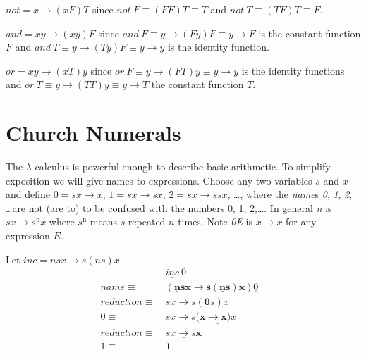 \documentclass[11pt,letterpaper,fleqn]{report}
\newcommand{\reason}[1]{{#1}\equiv\ }
\begin{document}
\(not = x\to (xF)T\) since \(not\ F\equiv (FF)T\equiv T\)
and \(not\ T\equiv (TF)T\equiv F\).

\(and = xy\to (xy)F\) since \(and\ F\equiv y\to (Fy)F\equiv y\to F\) is the
constant function \(F\) and \(and\ T\equiv y\to (Ty)F\equiv y\to y\) is the identity function.

\(or = xy\to (xT)y\) since \(or\ F\equiv y\to (FT)y\equiv y\to y\)
is the identity functions and \(or\ T\equiv y\to (TT)y\equiv y\to T\)
the constant function \(T\).



\section{Church Numerals}
The \(\lambda\)-calculus is powerful enough to describe basic arithmetic.
To simplify exposition we will give names to expressions. Choose any two
variables \(s\) and \(x\) and define \(\mathit{0} = sx \to x\),
\(\mathit{1} = sx\to s x\), \(\mathit{2} = sx\to s s x\), \dots,
where the {\it name}s {\it 0}, {\it 1}, {\it 2}, \dots are not (are to) to be
confused with the numbers 0, 1, 2,\dots.
In general
{\it n} is \(sx\to s^\mathrm{n}x\) where \(s^\mathrm{n}\) means
\(s\) repeated \(n\) times.
Note {\it 0E} is \(x\to x\) for any expression \(E\).
%

Let \(inc = nsx\to s (n s) x\).
\begin{align*}
&\underline{inc}\ \mathit{0}&\\
\reason{name}
&\bm{(\underline{n}sx\to s (\underline{n} s) x)}\underline{\mathit{0}}\\
\reason{reduction}
&sx\to s (\underline{\mathbf{0} s}) x\\
\reason{\mathit{0}}
&sx\to s (\underline{\bm{x\to x})x}\\
\reason{reduction}
&\underline{sx\to s \bm{x}}\\
\reason{\mathit{1}}
&\bm{1}\\
\end{align*}
\end{document}
